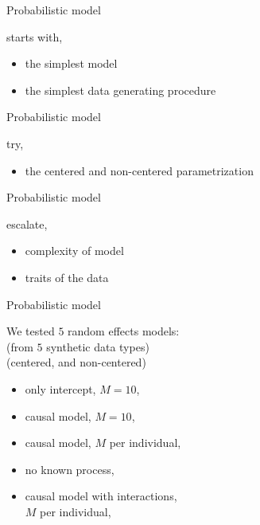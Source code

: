 %
\begin{lhframe}[rhgraphic={\texttt{[image: model\_design1.png]}}]
	{Probabilistic model}
	
	starts with,
	\begin{itemize}
		\item the simplest model
		\item the simplest data generating procedure
	\end{itemize}
\end{lhframe}
%
%
\begin{lhframe}[rhgraphic={\texttt{[image: model\_design2.png]}}]
	{Probabilistic model}
	
	try,
	\begin{itemize}
		\item the centered and non-centered parametrization
	\end{itemize}
\end{lhframe}
%
%
\begin{lhframe}[rhgraphic={\texttt{[image: model\_design3.png]}}]
	{Probabilistic model}
	
	escalate,
	\begin{itemize}
		\item complexity of model
		\item traits of the data
	\end{itemize}
\end{lhframe}
%
%
\begin{lhframe}[rhgraphic={\texttt{[image: model\_design3.png]}}]
	{Probabilistic model}
	
	We tested $5$ random effects models: \\
	{\small (from $5$ synthetic data types)} \\ 
	{\small (centered, and non-centered)}
	\begin{itemize}
		\item only intercept, $M=10$, 
		\item causal model, $M=10$,
		\item causal model, $M$ per individual,
		\item no known process,
		\item causal model with interactions, \\
		$M$ per individual,
	\end{itemize}
\end{lhframe}
%
%
